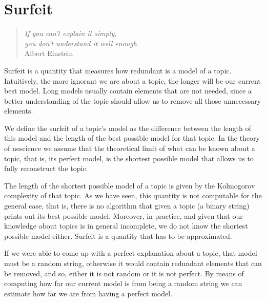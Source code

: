 %
%


\chapter{Surfeit}
\label{chap:Redundancy}

\begin{quote}
\begin{flushright}
\emph{If you can't explain it simply,\\
you don't understand it well enough.}\\
Albert Einstein 
\end{flushright}
\end{quote}
\bigskip

Surfeit is a quantity that measures how redundant is a model of a topic. Intuitively, the more ignorant we are about a topic, the longer will be our current best model. Long models usually contain elements that are not needed, since a better understanding of the topic should allow us to remove all those unnecessary elements. 

We define the surfeit of a topic's model as the difference between the length of this model and the length of the best possible model for that topic. In the theory of nescience we assume that the theoretical limit of what can be known about a topic, that is, its perfect model, is the shortest possible model that allows us to fully reconstruct the topic.

The length of the shortest possible model of a topic is given by the Kolmogorov complexity of that topic. As we have seen, this quantity is not computable for the general case, that is, there is no algorithm that given a topic (a binary string) prints out its best possible model. Moreover, in practice, and given that our knowledge about topics is in general incomplete, we do not know the shortest possible model either. Surfeit is a quantity that has to be approximated.

If we were able to come up with a perfect explanation about a topic, that model must be a random string, otherwise it would contain redundant elements that can be removed, and so, either it is not random or it is not perfect. By means of computing how far our current model is from being a random string we can estimate how far we are from having a perfect model.

